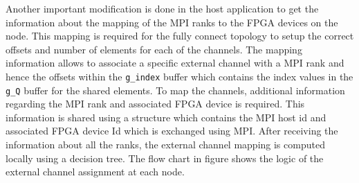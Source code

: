 Another important modification is done in the host application to get the information about
the mapping of the MPI ranks to the FPGA devices on the node. This mapping is required for the
fully connect topology to setup the correct offsets and number of elements for each of the channels.
The mapping information allows to associate a specific external channel with a MPI rank and hence the
offsets within the \texttt{g\_index} buffer which contains the index values in the \texttt{g\_Q}
buffer for the shared elements. To map the channels, additional information
regarding the MPI rank and associated FPGA device is required. This information is shared using
a structure which contains the MPI host id and associated FPGA device Id which is exchanged
using MPI. After receiving the information about all the ranks, the external channel mapping
is computed locally using a decision tree. The flow chart in figure 
shows the logic of the external channel assignment at each node.

